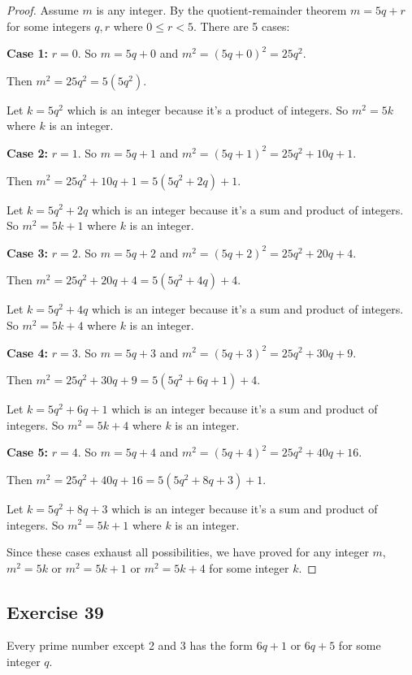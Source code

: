\documentclass[14pt]{extarticle}
\begin{document}
\begin{proof}
    Assume $m$ is any integer. By the quotient-remainder theorem $m = 5q+r$ for some integers $q,r$ where $0 \leq r < 5$. There are 5 cases:

    {\bf Case 1:} $r = 0$. So $m = 5q + 0$ and $m^2 = (5q+0)^2 = 25q^2$.

    Then $m^2 = 25q^2 = 5(5q^2)$.

    Let $k = 5q^2$ which is an integer because it's a product of integers. So $m^2 = 5k$ where $k$ is an integer.

        {\bf Case 2:} $r = 1$. So $m = 5q + 1$ and $m^2 = (5q + 1)^2 = 25q^2 + 10q + 1$.

    Then $m^2 = 25q^2 + 10q + 1 = 5(5q^2+2q)+1$.

    Let $k = 5q^2+2q$ which is an integer because it's a sum and product of integers. So $m^2 = 5k + 1$ where $k$ is an integer.

        {\bf Case 3:} $r = 2$. So $m = 5q + 2$ and $m^2 = (5q + 2)^2 = 25q^2 + 20q + 4$.

    Then $m^2 = 25q^2 + 20q + 4 = 5(5q^2+4q)+4$.

    Let $k = 5q^2+4q$ which is an integer because it's a sum and product of integers. So $m^2 = 5k +4$ where $k$ is an integer.

        {\bf Case 4:} $r = 3$. So $m = 5q + 3$ and $m^2 = (5q + 3)^2 = 25q^2 + 30q+9$.

    Then $m^2 = 25q^2 + 30q+9 = 5(5q^2+6q+1)+4$.

    Let $k = 5q^2+6q+1$ which is an integer because it's a sum and product of integers. So $m^2 = 5k + 4$ where $k$ is an integer.

        {\bf Case 5:} $r = 4$. So $m = 5q + 4$ and $m^2 = (5q + 4)^2 = 25q^2 + 40q + 16$.

    Then $m^2 = 25q^2 + 40q + 16 = 5(5q^2+8q+3)+1$.

    Let $k = 5q^2+8q+3$ which is an integer because it's a sum and product of integers. So $m^2 = 5k + 1$ where $k$ is an integer.

    Since these cases exhaust all possibilities, we have proved for any integer $m$, $m^2 = 5k$ or $m^2 = 5k+1$ or $m^2 = 5k+4$ for some integer $k$.
\end{proof}

\subsection{Exercise 39}
Every prime number except 2 and 3 has the form $6q + 1$ or $6q + 5$ for some integer $q$.
\end{document}
